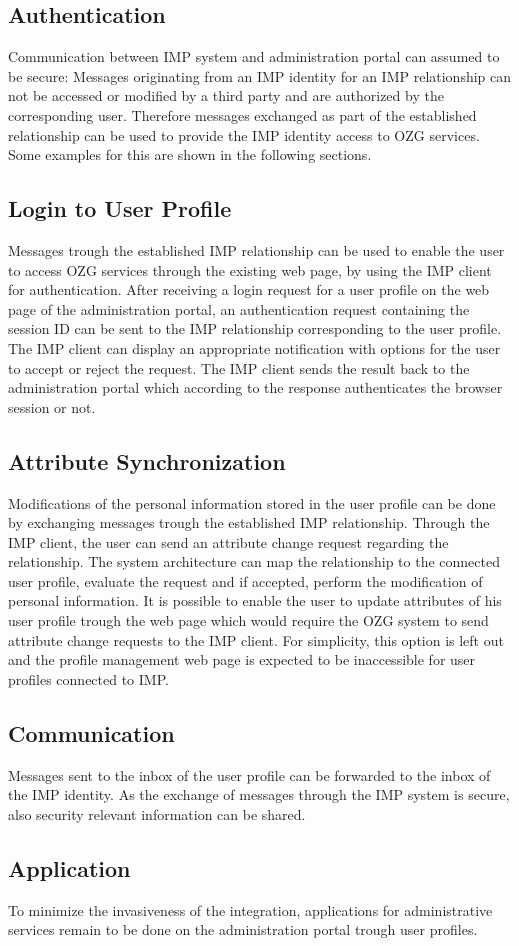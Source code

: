 \subsection{Authentication}
Communication between IMP system and administration portal can assumed to be secure: Messages originating from an IMP identity for an IMP relationship can not be accessed or modified by a third party and are authorized by the corresponding user. Therefore messages exchanged as part of the established relationship can be used to provide the IMP identity access to OZG services. Some examples for this are shown in the following sections.

\subsection{Login to User Profile}
Messages trough the established IMP relationship can be used to enable the user to access OZG services through the existing web page, by using the IMP client for authentication. After receiving a login request for a user profile on the web page of the administration portal, an authentication request containing the session ID can be sent to the IMP relationship corresponding to the user profile. The IMP client can display an appropriate notification with options for the user to accept or reject the request. The IMP client sends the result back to the administration portal which according to the response authenticates the browser session or not.

\subsection{Attribute Synchronization}
Modifications of the personal information stored in the user profile can be done by exchanging messages trough the established IMP relationship. Through the IMP client, the user can send an attribute change request regarding the relationship. The system architecture can map the relationship to the connected user profile, evaluate the request and if accepted, perform the modification of personal information. It is possible to enable the user to update attributes of his user profile trough the web page which would require the OZG system to send attribute change requests to the IMP client. For simplicity, this option is left out and the profile management web page is expected to be inaccessible for user profiles connected to IMP.

\subsection{Communication}
Messages sent to the inbox of the user profile can be forwarded to the inbox of the IMP identity. As the exchange of messages through the IMP system is secure, also security relevant information can be shared.

\subsection{Application}
To minimize the invasiveness of the integration, applications for administrative services remain to be done on the administration portal trough user profiles.
